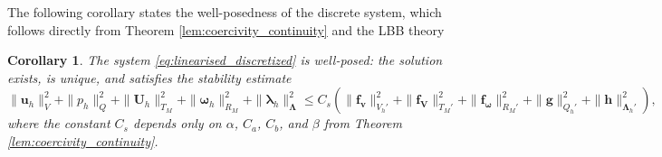 \documentclass{article}
\newcommand{\bU}{{\mathbf{U}}}
\newcommand{\bu}{{\mathbf{u}}}
\newcommand{\bv}{{\mathbf{v}}}
\newcommand{\bomega}{{\boldsymbol{\omega}}}
\newtheorem{corollary}[theorem]{Corollary}
\begin{document}
The following corollary states the well-posedness of the discrete system, which follows directly from Theorem \ref{lem:coercivity_continuity} and the LBB theory \cite{babuvska1973finite,boffi2013mixed}
\begin{corollary}
    The system \eqref{eq:linearised_discretized} is well-posed: the solution exists, is unique, and satisfies the stability estimate
    \begin{equation}
        \|\bu_h\|_V^2 + \|p_h\|_Q^2 + \|\bU_h\|_{T_M}^2 + \|\boldsymbol{\omega}_h\|_{R_M}^2 + \|\boldsymbol{\lambda}_h\|_{\boldsymbol{\Lambda}}^2 \leq C_s \left( \|{\mathbf{f}}_\bv\|_{V_h'}^2 + \|{\mathbf{f}}_\mathbf{V}\|_{T_M'}^2 + \|{\mathbf{f}}_\bomega\|_{R_M'}^2 + \|{\mathbf{g}}\|_{Q_h'}^2 + \|{\mathbf{h}}\|_{\boldsymbol{\Lambda}_h'}^2 \right),
    \end{equation}
    where the constant $C_s$ depends only on $\alpha$, $C_a$, $C_b$, and $\beta$ from Theorem \ref{lem:coercivity_continuity}.
\end{corollary}
\end{document}
